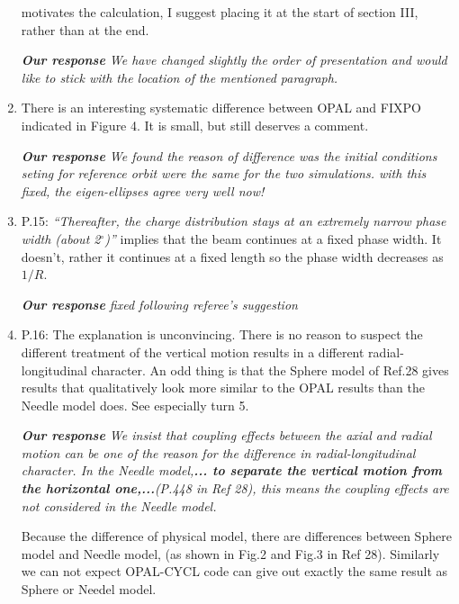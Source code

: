 \documentclass[10pt]{report}
\begin{document}
\begin{enumerate}
 motivates the calculation, I suggest placing it at the start of section III,
 rather than at the end.


 \vspace{+2mm}
 {\it {\bf Our response}  
 We have changed slightly the order of presentation and would like to stick with the location of the mentioned paragraph.}
 \vspace{+2mm}
 
  \item There is an interesting systematic difference between OPAL and FIXPO
 indicated in 
 Figure 4. It is small, but still deserves a comment.


 \vspace{+2mm}
 {\it {\bf Our response} We found the reason of difference was the initial conditions seting for reference orbit were  the same for the two simulations.
with this fixed, the eigen-ellipses agree very well now!
   
 }
 \vspace{+2mm}
  

  \item P.15: \textit{``Thereafter, the charge distribution stays at an
 extremely narrow 
 phase width (about 2$^\circ$)''} implies that the beam continues at a fixed
 phase width. It doesn't, rather it continues at a fixed length so the phase
 width decreases as $1/R$.


 \vspace{+2mm}
 {\it {\bf Our response}  fixed following referee's suggestion
 }
 \vspace{+2mm}
 
 \item P.16: The explanation is unconvincing. There is no reason to suspect the
 different treatment of the vertical motion results in a different
 radial-longitudinal character. An odd thing is that the Sphere model of Ref.28
 gives results that qualitatively look more similar to the OPAL results than the
 Needle model does. See especially turn 5.


 \vspace{+2mm}
 {\it {\bf Our response}   
   We insist that coupling effects between the axial and radial motion can be one of the reason for the difference in radial-longitudinal character.
   In the Needle model,{\bf ... to separate the vertical motion from the horizontal one,...}(P.448 in Ref 28), 
   this means the coupling effects are not considered in the Needle model.  
 
   Because the difference of physical model, there are differences between Sphere model and Needle model, (as shown in  Fig.2 and Fig.3 in Ref 28).
   Similarly we can not expect OPAL-CYCL code can give out exactly the same result as Sphere or Needel model. 
 }
 \vspace{+2mm}


\end{enumerate}
\end{document}
